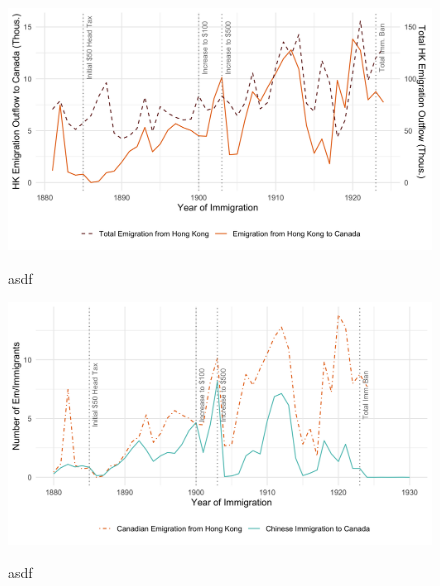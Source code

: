 \begin{figure}
    \centering 
    \caption{asdf}
    \includegraphics[width=\textwidth]{../../figs/fig2_flow_hkemig.png}
    \label{fig:hkemig}
\end{figure}

\begin{figure}
    \centering 
    \caption{asdf}
    \includegraphics[width=\textwidth]{../../figs/fig2_flow_immandem.png}
    \label{fig:hkemig}
\end{figure}
